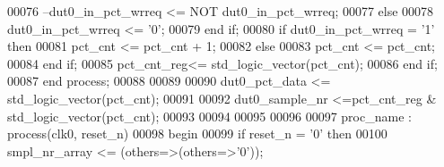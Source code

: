 \begin{DoxyCode}
00076 \textcolor{keyword}{               --dut0\_in\_pct\_wrreq <= NOT dut0\_in\_pct\_wrreq;}
00077             \textcolor{keywordflow}{else} 
00078                \textcolor{vhdlchar}{dut0_in_pct_wrreq} \textcolor{vhdlchar}{<=} \textcolor{vhdlchar}{'}\textcolor{vhdllogic}{}\textcolor{vhdllogic}{0}\textcolor{vhdlchar}{'};
00079             \textcolor{keywordflow}{end} \textcolor{keywordflow}{if};
00080          \textcolor{keywordflow}{if} \textcolor{vhdlchar}{dut0_in_pct_wrreq} \textcolor{vhdlchar}{=} \textcolor{vhdlchar}{'}\textcolor{vhdllogic}{}\textcolor{vhdllogic}{1}\textcolor{vhdlchar}{'} \textcolor{keywordflow}{then} 
00081             \textcolor{vhdlchar}{pct_cnt} \textcolor{vhdlchar}{<=} \textcolor{vhdlchar}{pct_cnt} \textcolor{vhdlchar}{+} \textcolor{vhdllogic}{}\textcolor{vhdllogic}{1};
00082          \textcolor{keywordflow}{else} 
00083             \textcolor{vhdlchar}{pct_cnt} \textcolor{vhdlchar}{<=} \textcolor{vhdlchar}{pct_cnt};
00084          \textcolor{keywordflow}{end} \textcolor{keywordflow}{if};
00085          \textcolor{vhdlchar}{pct_cnt_reg}\textcolor{vhdlchar}{<=} \textcolor{comment}{std\_logic\_vector}\textcolor{vhdlchar}{(}\textcolor{vhdlchar}{pct_cnt}\textcolor{vhdlchar}{)};
00086         \textcolor{keywordflow}{end} \textcolor{keywordflow}{if};
00087     \textcolor{keywordflow}{end} \textcolor{keywordflow}{process};
00088     
00089   
00090    \textcolor{vhdlchar}{dut0_pct_data}  \textcolor{vhdlchar}{<=} \textcolor{comment}{std\_logic\_vector}\textcolor{vhdlchar}{(}\textcolor{vhdlchar}{pct_cnt}\textcolor{vhdlchar}{)};
00091    
00092    \textcolor{vhdlchar}{dut0_sample_nr} \textcolor{vhdlchar}{<=}\textcolor{vhdlchar}{pct_cnt_reg} \textcolor{vhdlchar}{&} \textcolor{comment}{std\_logic\_vector}\textcolor{vhdlchar}{(}\textcolor{vhdlchar}{pct_cnt}\textcolor{vhdlchar}{)};
00093    
00094    
00095    
00096    
00097    proc\_name : \textcolor{keywordflow}{process}(clk0, reset_n)
00098 \textcolor{vhdlkeyword}{   begin}
00099       \textcolor{keywordflow}{if} \textcolor{vhdlchar}{reset_n} \textcolor{vhdlchar}{=} \textcolor{vhdlchar}{'}\textcolor{vhdllogic}{}\textcolor{vhdllogic}{0}\textcolor{vhdlchar}{'} \textcolor{keywordflow}{then} 
00100          \textcolor{vhdlchar}{smpl_nr_array} \textcolor{vhdlchar}{<=} \textcolor{vhdlchar}{(}\textcolor{keywordflow}{others}\textcolor{vhdlchar}{=}\textcolor{vhdlchar}{>}\textcolor{vhdlchar}{(}\textcolor{keywordflow}{others}\textcolor{vhdlchar}{=}\textcolor{vhdlchar}{>}\textcolor{vhdlchar}{'}\textcolor{vhdllogic}{}\textcolor{vhdllogic}{0}\textcolor{vhdlchar}{'}\textcolor{vhdlchar}{)}\textcolor{vhdlchar}{)};

\end{DoxyCode}
